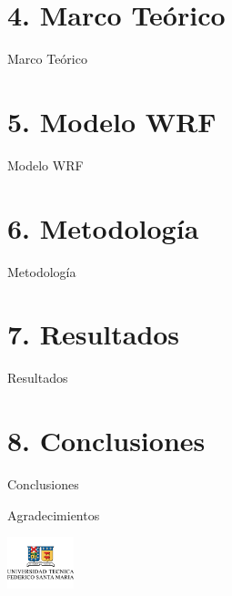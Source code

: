 \documentclass[mathserif]{beamer}
\begin{document}
\section{4. Marco Teórico}
\begin{frame}{Marco Teórico}
\end{frame}

\section{5. Modelo WRF}
\begin{frame}{Modelo WRF}
\end{frame}

\section{6. Metodología}
\begin{frame}{Metodología}
\end{frame}

\section{7. Resultados}
\begin{frame}{Resultados}
\end{frame}

\section{8. Conclusiones}
\begin{frame}{Conclusiones}
\end{frame}

\begin{frame}{Agradecimientos}
\end{frame}


\begin{frame}
	\vspace{0.3cm}
	\begin{center} \includegraphics[height=1.5cm]{utfsm_logo} \end{center}
	\vspace{-0.5cm}
	\titlepage
\end{frame}
\end{document}
